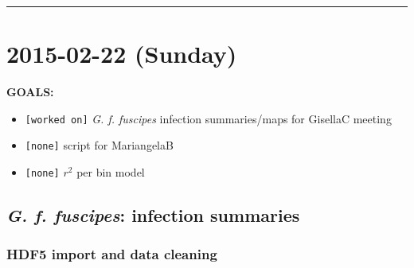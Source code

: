 \documentclass[letterpaper]{scrartcl}
\begin{document}
\begin{center}\rule{0.5\linewidth}{\linethickness}\end{center}

\section{2015-02-22 (Sunday)}\label{sunday-1}

\textbf{GOALS:}

\begin{itemize}
\itemsep1pt\parskip0pt
\item
  \texttt{{[}worked on{]}} \emph{G. f. fuscipes} infection
  summaries/maps for GisellaC meeting
\item
  \texttt{{[}none{]}} script for MariangelaB
\item
  \texttt{{[}none{]}} \(r^2\) per bin model
\end{itemize}

\subsection{\emph{G. f. fuscipes}: infection
summaries}\label{g.-f.-fuscipes-infection-summaries-2}

\subsubsection{HDF5 import and data
cleaning}\label{hdf5-import-and-data-cleaning}
\end{document}
